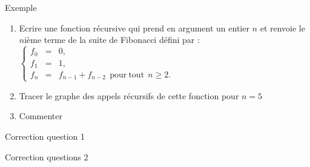 \documentclass[10pt]{beamer}
\begin{document}
\begin{frame}{\Ctitle}{\stitle}
	\begin{exampleblock}{Exemple}
		\begin{enumerate}
			\item<1-> Ecrire une fonction récursive qui prend en argument un entier $n$ et renvoie le $n$ième terme de la suite de Fibonacci défini par :
				$\left\{ \begin{array}{lll}
						f_0   & = & 0,                                                  \\
						f_1   & = & 1,                                                  \\
						f_{n} & = & f_{n-1}+f_{n-2} \mathrm{\ \ pour\ tout\ \ } n\geq2.\end{array} \right.$
			\item<2-> Tracer le graphe des appels récursifs de cette fonction pour $n=5$
			\item<3-> Commenter
		\end{enumerate}
	\end{exampleblock}
\end{frame}

\begin{frame}{\Ctitle}{\stitle}
	\begin{exampleblock}{Correction question 1}
	\end{exampleblock}
\end{frame}

\begin{frame}{\Ctitle}{\stitle}
	\begin{exampleblock}{Correction questions 2}
		\begin{center}
		\end{center}
	\end{exampleblock}
\end{frame}
\end{document}
